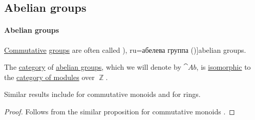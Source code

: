 \subsection{Abelian groups}\label{subsec:abelian_groups}

\paragraph{Abelian groups}

\begin{definition}\label{def:abelian_group}
  \hyperref[def:binary_operation/commutative]{Commutative} \hyperref[def:group]{groups} are often called \term[bg=абелева группа (\cite[29]{КоцевСидеров2016}), ru=абелева группа (\cite[sec. 2.6]{Тыртышников2007})]{abelian groups}.
\end{definition}

\begin{proposition}\label{thm:category_of_abelian_groups}
  The \hyperref[def:category]{category} of \hyperref[def:abelian_group]{abelian groups}, which we will denote by \( \cat{Ab} \), is \hyperref[rem:category_similarity/isomorphism]{isomorphic} to the \hyperref[def:module/category]{category of modules} over \( \BbbZ \).
\end{proposition}
\begin{comments}
  \item Similar results include  for commutative monoids and  for rings.
\end{comments}
\begin{proof}
  Follows from the similar proposition for commutative monoids .
\end{proof}

